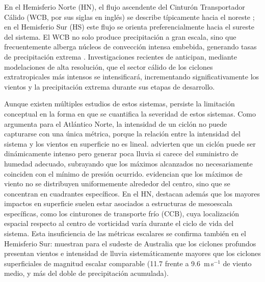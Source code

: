 En el Hemisferio Norte (HN), el flujo ascendente del Cinturón Transportador Cálido (WCB, por sus siglas en inglés) se describe típicamente hacia el noreste \citep{blanchard2021warm}; en el Hemisferio Sur (HS) este flujo se orienta preferencialmente hacia el sureste del sistema.
El WCB no solo produce precipitación a gran escala, sino que frecuentemente alberga núcleos de convección intensa embebida, generando tasas de precipitación extrema \citep{oertel2021warm}. Investigaciones recientes de \citet{gentile2025response} anticipan, mediante modelaciones de alta resolución, que el sector cálido de los ciclones extratropicales más intensos se intensificará, incrementando significativamente los vientos y la precipitación extrema durante sus etapas de desarrollo.


Aunque existen múltiples estudios de estos sistemas, persiste la limitación conceptual en la forma en que se cuantifica la severidad de estos sistemas. Como argumenta \citet{corner2025classification} para el Atlántico Norte, la intensidad de un ciclón no puede capturarse con una única métrica, porque la relación entre la intensidad del sistema y los vientos en superficie no es lineal. \citet{sinclair2023relationship} advierten que un ciclón puede ser dinámicamente intenso pero generar poca lluvia si carece del suministro de humedad adecuado, subrayando que los máximos alcanzados no necesariamente coinciden con el mínimo de presión ocurrido. \citet{cardoso2022synoptic} evidencian que los máximos de viento no se distribuyen uniformemente alrededor del centro, sino que se concentran en cuadrantes específicos. En el HN, \citet{eisenstein2023identification} destacan además que los mayores impactos en superficie suelen estar asociados a estructuras de mesoescala específicas, como los cinturones de transporte frío (CCB), cuya localización espacial respecto al centro de vorticidad varía durante el ciclo de vida del sistema. Esta insuficiencia de las métricas escalares se confirma también en el Hemisferio Sur: \citet{pepler2020dimensional} muestran para el sudeste de Australia que los ciclones profundos presentan vientos e intensidad de lluvia sistemáticamente mayores que los ciclones superficiales de magnitud escalar comparable (11.7 frente a 9.6~m\,s$^{-1}$ de viento medio, y más del doble de precipitación acumulada).

